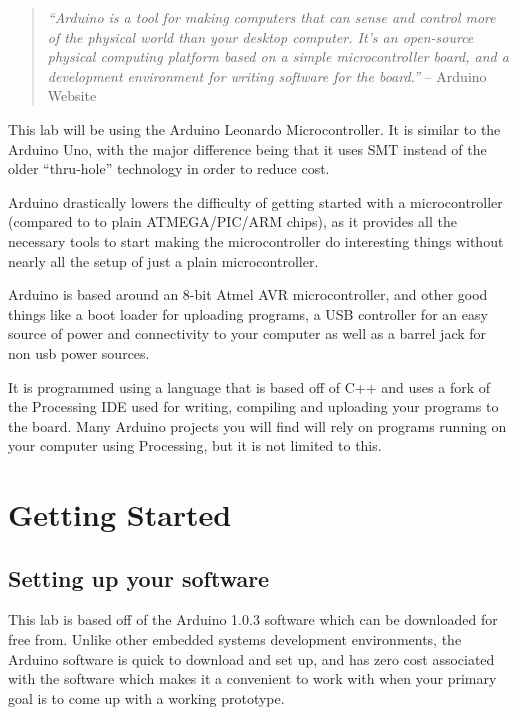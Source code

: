 \documentclass[11pt,a4paper]{article}
\begin{document}
\begin{quote}
\emph{``Arduino is a tool for making computers that can sense and control more of the physical world than your desktop computer. It's an open-source physical computing platform based on a simple microcontroller board, and a development environment for writing software for the board.''} -- Arduino Website\cite{arduino-guide}
\end{quote}

This lab will be using the Arduino Leonardo Microcontroller\cite{leonardo}.  It is similar to the Arduino Uno\cite{uno}, with the major difference being that it uses SMT\cite{smt} instead of the older ``thru-hole''\cite{th} technology in order to reduce cost.

Arduino drastically lowers the difficulty of getting started with a microcontroller (compared to to plain ATMEGA/PIC/ARM chips), as it provides all the necessary tools to start making the microcontroller do interesting things without nearly all the setup of just a plain microcontroller.

Arduino is based around an 8-bit Atmel AVR microcontroller, and other good things like a boot loader for uploading programs, a USB controller for an easy source of power and connectivity to your computer as well as a barrel jack for non usb power sources.

It is programmed using a language that is based off of C++ and uses a fork of the Processing IDE used for writing, compiling and uploading your programs to the board.  Many Arduino projects you will find will rely on programs running on your computer using Processing, but it is not limited to this.\cite{processing}




\section{Getting Started} %
\label{sec:getting_started}

\subsection{Setting up your software} %

This lab is based off of the Arduino 1.0.3 software which can be downloaded for free from\cite{arduino-dl}.  Unlike other embedded systems development environments, the Arduino software is quick to download and set up, and has zero cost associated with the software which makes it a convenient to work with when your primary goal is to come up with a working prototype.
\end{document}
